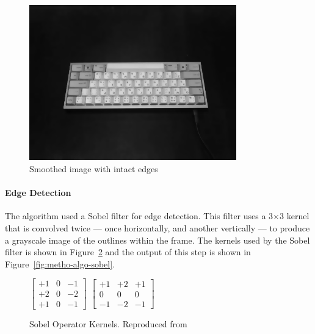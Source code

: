 \documentclass{report}
\begin{document}
\begin{figure}[H]
	\centering
	\includegraphics[width=0.8\textwidth]{denoised.png}
	\caption{Smoothed image with intact edges}
	\centering
	\label{fig:metho-algo-denoise}
\end{figure}


\paragraph{Edge Detection}
The algorithm used a Sobel filter for edge detection. This filter uses a
3$\times$3 kernel that is convolved twice --- once horizontally, and another
vertically --- to produce a grayscale image of the outlines within the frame.
The kernels used by the Sobel filter \parencite{sobel2014} is shown in
Figure~\ref{fig:metho-algo-key-sobel} and the output of this step is shown in
Figure~\ref{fig:metho-algo-sobel}.

\begin{figure}[H]
	\centering
	$\begin{bmatrix}
			+1 & 0 & -1 \\
			+2 & 0 & -2 \\
			+1 & 0 & -1
		\end{bmatrix}$
	$\begin{bmatrix}
			+1 & +2 & +1 \\
			0  & 0  & 0  \\
			-1 & -2 & -1
		\end{bmatrix}$
	\caption{Sobel Operator Kernels. Reproduced from }
	\label{fig:metho-algo-key-sobel}
\end{figure}
\end{document}
